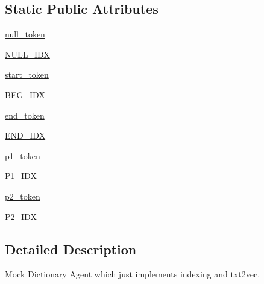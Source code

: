 \subsection*{Static Public Attributes}
\begin{DoxyCompactItemize}
\item 
\hyperlink{classparlai_1_1agents_1_1test__agents_1_1dummy__torch__agent_1_1MockDict_a58d20df18e1f97041a2828010bc66da9}{null\+\_\+token}
\item 
\hyperlink{classparlai_1_1agents_1_1test__agents_1_1dummy__torch__agent_1_1MockDict_a11af2071e8f910d06b06de4949032381}{N\+U\+L\+L\+\_\+\+I\+DX}
\item 
\hyperlink{classparlai_1_1agents_1_1test__agents_1_1dummy__torch__agent_1_1MockDict_a17c2d55618760f2916f20cdaa5e659e4}{start\+\_\+token}
\item 
\hyperlink{classparlai_1_1agents_1_1test__agents_1_1dummy__torch__agent_1_1MockDict_a54653a42564b2dec7048ea9b8aa9688d}{B\+E\+G\+\_\+\+I\+DX}
\item 
\hyperlink{classparlai_1_1agents_1_1test__agents_1_1dummy__torch__agent_1_1MockDict_a1af09596961d2578565b6fa0b58b361d}{end\+\_\+token}
\item 
\hyperlink{classparlai_1_1agents_1_1test__agents_1_1dummy__torch__agent_1_1MockDict_a5322f4b2c684f639f0be36961fbd5843}{E\+N\+D\+\_\+\+I\+DX}
\item 
\hyperlink{classparlai_1_1agents_1_1test__agents_1_1dummy__torch__agent_1_1MockDict_a8a76836abfa35bb9533ba0282a610613}{p1\+\_\+token}
\item 
\hyperlink{classparlai_1_1agents_1_1test__agents_1_1dummy__torch__agent_1_1MockDict_ac02fcc16933f6a90db5294015d3dabfe}{P1\+\_\+\+I\+DX}
\item 
\hyperlink{classparlai_1_1agents_1_1test__agents_1_1dummy__torch__agent_1_1MockDict_aac9d038472d8ab321fc9d76d2bebc849}{p2\+\_\+token}
\item 
\hyperlink{classparlai_1_1agents_1_1test__agents_1_1dummy__torch__agent_1_1MockDict_a08c2f1e4375953547407ed85cb7d471e}{P2\+\_\+\+I\+DX}
\end{DoxyCompactItemize}


\subsection{Detailed Description}
\begin{DoxyVerb}Mock Dictionary Agent which just implements indexing and txt2vec.
\end{DoxyVerb}
 

